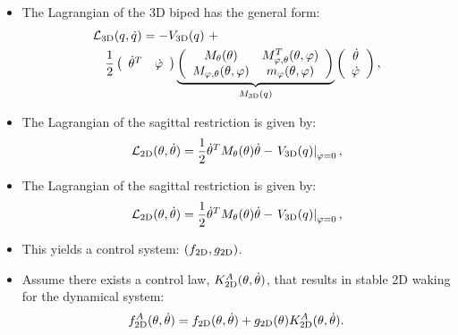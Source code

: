 {   {
    \begin{itemize}
    \item  The Lagrangian of the 3D biped has the general form:
      \begin{eqnarray}
        \label{eq:submats}
        \lefteqn{\Lfd(\cq{},\cdq{}) = -\Vu \ + }\\
        \nonumber
        &&\frac{1}{2}
        \left(\begin{array}{c c}
          \dot{\theta}^T & \dot{\varphi}
        \end{array}\right)
        \underbrace{\left(\begin{array}{c c}
            \Mth & \Mphitheta^T(\theta,\varphi)\\
            \Mphitheta(\theta,\varphi) & \Mphi(\theta,\varphi)
          \end{array}\right)}_{\mMu}
        \left(\begin{array}{c}
          \dot{\theta}\\
          \dot{\varphi}
        \end{array}\right), \nonumber
      \end{eqnarray}
      \vspace{-5mm}

    \item The Lagrangian of the sagittal restriction is given by:
      \begin{align*}
        \mathcal{L}_\mathrm{2D}(\theta,\dot{\theta}) = \frac{1}{2} \dot{\theta}^T M_{\theta}(\theta) \dot{\theta} - \left.V_\mathrm{3D}(q_{})\right\vert_{\varphi=0},
      \end{align*}

    \end{itemize}
  }

   {
    \vspace{-.1cm}
    \begin{itemize}

    \item The Lagrangian of the sagittal restriction is given by:
      \begin{align*}
        \mathcal{L}_\mathrm{2D}(\theta,\dot{\theta}) = \frac{1}{2} \dot{\theta}^T M_{\theta}(\theta) \dot{\theta} - \left.V_\mathrm{3D}(q_{})\right\vert_{\varphi=0},
      \end{align*}

    \item This yields a control system: $(f_\mathrm{2D},g_\mathrm{2D})$.

    \item \alert{Assume} there exists a control law, $K_\mathrm{2D}^{A}(\theta,\dot{\theta})$, that results in stable 2D waking for the dynamical system:
      \begin{align*}
        f_\mathrm{2D}^{A}(\theta,\dot{\theta}) = f_\mathrm{2D}(\theta, \dot{\theta}) + g_\mathrm{2D}(\theta) K_\mathrm{2D}^{A}(\theta,\dot{\theta}).
      \end{align*}


\end{itemize}}}
